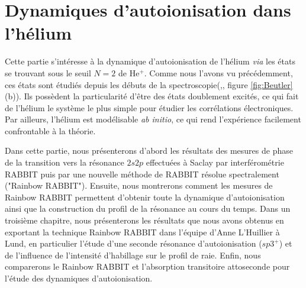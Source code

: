 \part{Dynamiques d'autoionisation dans l'hélium}
Cette partie s'intéresse à la dynamique d'autoionisation de l'hélium \textit{via} les états se trouvant sous le seuil $N=2$ de He$^+$. Comme nous l'avons vu précédemment, ces états sont étudiés depuis les débuts de la spectroscopie(,, figure \ref{fig:Beutler}(b)). Ils possèdent la particularité d'être des états doublement excités, ce qui fait de l'hélium le système le plus simple pour étudier les corrélations électroniques. Par ailleurs, l'hélium est modélisable \textit{ab initio}, ce qui rend l'expérience facilement confrontable à la théorie.

Dans cette partie, nous présenterons d'abord les résultats des mesures de phase de la transition vers la résonance $2s2p$ effectuées à Saclay par interférométrie RABBIT puis par une nouvelle méthode de RABBIT résolue spectralement ("Rainbow RABBIT"). Ensuite, nous montrerons comment les mesures de Rainbow RABBIT permettent d'obtenir toute la dynamique d'autoionisation ainsi que la construction du profil de la résonance au cours du temps. Dans un troisième chapitre, nous présenterons les résultats que nous avons obtenus en exportant la technique Rainbow RABBIT dans l'équipe d'Anne L'Huillier à Lund, en particulier l'étude d'une seconde résonance d'autoionisation ($sp3^+$) et de l'influence de l'intensité d'habillage sur le profil de raie. Enfin, nous comparerons le Rainbow RABBIT et l'absorption transitoire attoseconde pour l'étude des dynamiques d'autoionisation.

